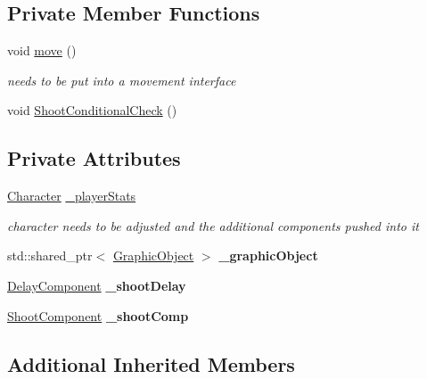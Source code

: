 \subsection*{Private Member Functions}
\begin{DoxyCompactItemize}
\item 
\mbox{\label{class_player_ae02ee46d8c20dd0697b975f935b09839}} 
void \hyperlink{class_player_ae02ee46d8c20dd0697b975f935b09839}{move} ()
\begin{DoxyCompactList}\small\item\em needs to be put into a movement interface \end{DoxyCompactList}\item 
void \hyperlink{class_player_a54bee4abe93eea15c48fdbd85e4fdbd5}{Shoot\+Conditional\+Check} ()
\end{DoxyCompactItemize}
\subsection*{Private Attributes}
\begin{DoxyCompactItemize}
\item 
\mbox{\label{class_player_ada278ae5d697b54e4f06129235a15abe}} 
\hyperlink{class_character}{Character} \hyperlink{class_player_ada278ae5d697b54e4f06129235a15abe}{\+\_\+player\+Stats}
\begin{DoxyCompactList}\small\item\em character needs to be adjusted and the additional components pushed into it \end{DoxyCompactList}\item 
\mbox{\label{class_player_a39dd8190de0f476b7e7f65e4e7b0c464}} 
std\+::shared\+\_\+ptr$<$ \hyperlink{class_graphic_object}{Graphic\+Object} $>$ {\bfseries \+\_\+graphic\+Object}
\item 
\mbox{\label{class_player_a6d672baf3630a81a32a8b9565129f559}} 
\hyperlink{class_delay_component}{Delay\+Component} {\bfseries \+\_\+shoot\+Delay}
\item 
\mbox{\label{class_player_a042205598416a7090d81d60b95f4ceec}} 
\hyperlink{class_shoot_component}{Shoot\+Component} {\bfseries \+\_\+shoot\+Comp}
\end{DoxyCompactItemize}
\subsection*{Additional Inherited Members}


